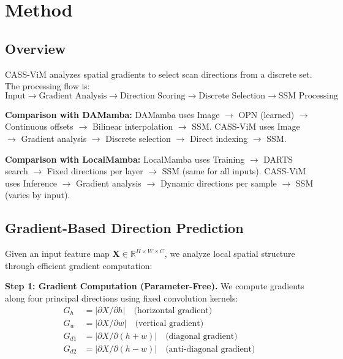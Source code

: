 \documentclass{article}
\begin{document}
\section{Method}
\label{sec:method}

\subsection{Overview}

CASS-ViM analyzes spatial gradients to select scan directions from a discrete set. The processing flow is:
\begin{equation}
\text{Input} \rightarrow \text{Gradient Analysis} \rightarrow \text{Direction Scoring} \rightarrow \text{Discrete Selection} \rightarrow \text{SSM Processing}
\end{equation}

\textbf{Comparison with DAMamba:} DAMamba uses Image $\rightarrow$ OPN (learned) $\rightarrow$ Continuous offsets $\rightarrow$ Bilinear interpolation $\rightarrow$ SSM. CASS-ViM uses Image $\rightarrow$ Gradient analysis $\rightarrow$ Discrete selection $\rightarrow$ Direct indexing $\rightarrow$ SSM.

\textbf{Comparison with LocalMamba:} LocalMamba uses Training $\rightarrow$ DARTS search $\rightarrow$ Fixed directions per layer $\rightarrow$ SSM (same for all inputs). CASS-ViM uses Inference $\rightarrow$ Gradient analysis $\rightarrow$ Dynamic directions per sample $\rightarrow$ SSM (varies by input).

\subsection{Gradient-Based Direction Prediction}

Given an input feature map $\mathbf{X} \in \mathbb{R}^{H \times W \times C}$, we analyze local spatial structure through efficient gradient computation:

\textbf{Step 1: Gradient Computation (Parameter-Free).} We compute gradients along four principal directions using fixed convolution kernels:
\begin{align}
G_h &= |\partial X / \partial h| \quad \text{(horizontal gradient)} \\
G_w &= |\partial X / \partial w| \quad \text{(vertical gradient)} \\
G_{d1} &= |\partial X / \partial (h+w)| \quad \text{(diagonal gradient)} \\
G_{d2} &= |\partial X / \partial (h-w)| \quad \text{(anti-diagonal gradient)}
\end{align}
\end{document}
